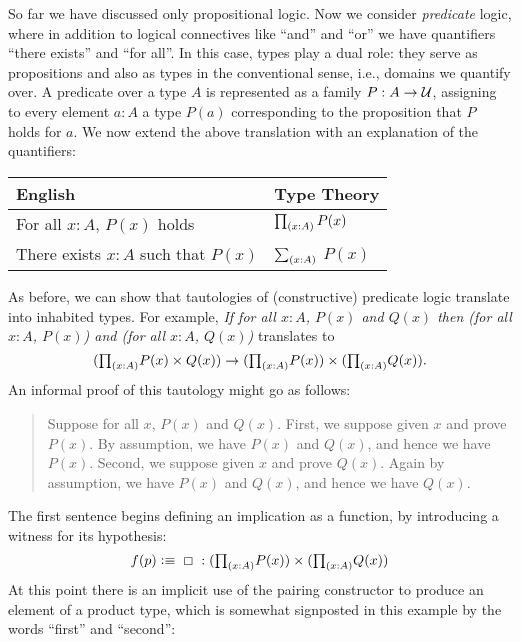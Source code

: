 So far we have discussed only propositional logic.
%
%
%
%
%
Now we consider \emph{predicate} logic, where in addition to logical connectives like ``and'' and ``or'' we have quantifiers ``there exists'' and ``for all''.
In this case, types play a dual role: they serve as propositions and also as types in the conventional sense, i.e., domains we quantify over.
A predicate over a type $A$ is represented as a family $P : A \to \mathcal{U}$, assigning to every element $a : A$ a type $P(a)$ corresponding to the proposition that $P$ holds for $a$. We now extend the above translation with an explanation of the quantifiers:
\begin{center}
  \medskip
  \begin{tabular}{ll}
    \toprule
    English & Type Theory\\
    \midrule
    For all $x:A$, $P(x)$ holds & $\prd{x:A} P(x)$ \\
    There exists $x:A$ such that $P(x)$ & $\sm{x:A}$ $P(x)$ \\
    \bottomrule
  \end{tabular}
  \medskip
\end{center}
As before, we can show that tautologies of (constructive) predicate logic translate into inhabited types.
For example, \emph{If for all $x:A$, $P(x)$ and $Q(x)$ then (for all $x:A$, $P(x)$) and (for all $x:A$, $Q(x)$)} translates to
\[ (\tprd{x:A} P(x) \times Q(x)) \to (\tprd{x:A} P(x)) \times (\tprd{x:A} Q(x)). \]
An informal proof of this tautology might go as follows:
\begin{quote}
  Suppose for all $x$, $P(x)$ and $Q(x)$.
  First, we suppose given $x$ and prove $P(x)$.
  By assumption, we have $P(x)$ and $Q(x)$, and hence we have $P(x)$.
  Second, we suppose given $x$ and prove $Q(x)$.
  Again by assumption, we have $P(x)$ and $Q(x)$, and hence we have $Q(x)$.
\end{quote}
The first sentence begins defining an implication as a function, by introducing a witness for its hypothesis:
\[ f(p) \defeq \;\Box\; : (\tprd{x:A} P(x)) \times (\tprd{x:A} Q(x)) \]
At this point there is an implicit use of the pairing constructor to produce an element of a product type, which is somewhat signposted in this example by the words ``first'' and ``second'':
